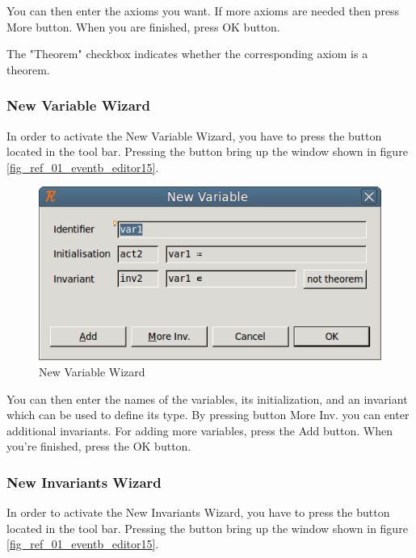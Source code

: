 You can then enter the axioms you want. If more axioms are needed then press \textsf{More} button. When you are finished, press \textsf{OK} button.

The "Theorem" checkbox indicates whether the corresponding axiom is a theorem.

\subsubsection{New Variable Wizard}

In order to activate the \textsf{New Variable Wizard}, you have to press the  button located in the tool bar. Pressing the button bring up the window shown in figure \ref{fig_ref_01_eventb_editor15}.

\begin{figure}[!h]
\begin{center}
	\includegraphics{img/reference/ref_01_eventb_editor14.png}
	\caption{New Variable Wizard}
	\label{fig_ref_01_eventb_editor14}
\end{center}
\end{figure}

You can then enter the names of the variables, its initialization, and an invariant which can be used to define its type. By pressing button \textsf{More Inv.} you can enter additional invariants. For adding more variables, press the \textsf{Add} button. When you’re finished, press the \textsf{OK} button. 

\subsubsection{New Invariants Wizard}

In order to activate the \textsf{New Invariants Wizard}, you have to press the  button located in the tool bar. Pressing the button bring up the window shown in figure \ref{fig_ref_01_eventb_editor15}.

